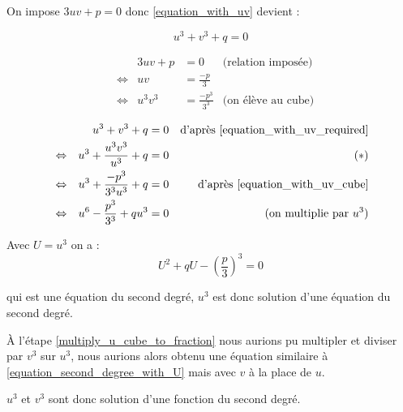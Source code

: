 \documentclass[]{../templates/homework}
\begin{document}
\question

On impose $3uv + p = 0$ donc \eqref{equation_with_uv} devient :

\begin{equation*}
	u^3 + v^3 + q = 0 \tag{$E_3$} \label{equation_with_uv_required}
\end{equation*}

\question

\begin{align*}
	 &                 & 3uv + p & = 0                & \text{(relation imposée)}                                           \\
	 & \Leftrightarrow & uv      & = \frac{-p}{3}     &                                                                     \\
	 & \Leftrightarrow & u^3v^3  & = \frac{-p^3}{3^3} & \text{(on élève au cube)} \tag{$E_4$} \label{equation_with_uv_cube}
\end{align*}

\question

\begin{align*}
	 &                 & u^3 + v^3 + q                 & = 0 & \text{d'après \eqref{equation_with_uv_required}} \\
	 & \Leftrightarrow & u^3 + \frac{u^3v^3}{u^3} + q  & = 0 & \tag{$\ast$} \label{multiply_u_cube_to_fraction} \\
	 & \Leftrightarrow & u^3 + \frac{-p^3}{3^3u^3} + q & = 0 & \text{d'après \eqref{equation_with_uv_cube}}     \\
	 & \Leftrightarrow & u^6 - \frac{p^3}{3^3} + qu^3  & = 0 & \text{(on multiplie par $u^3$)}
\end{align*}

Avec $U = u^3$ on a :
\begin{equation}
	\tag{$E_5$}
	U^2 + qU - \left(\frac{p}{3}\right)^3 = 0
	\label{equation_second_degree_with_U}
\end{equation}

qui est une équation du second degré, $u^3$ est donc solution d'une équation du second degré.

À l'étape \eqref{multiply_u_cube_to_fraction} nous aurions pu multipler et diviser par $v^3$ sur $u^3$, nous aurions alors obtenu une équation similaire à \eqref{equation_second_degree_with_U} mais avec $v$ à la place de $u$.

$u^3$ et $v^3$ sont donc solution d'une fonction du second degré.
\end{document}
